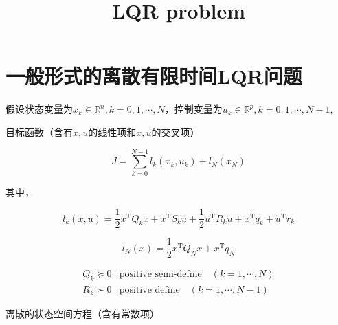 \documentclass[withoutpreface,bwprint]{NoteBook}
\title{LQR problem}  %
\begin{document}
\maketitle






\tableofcontents  %
\newpage


\section{一般形式的离散有限时间LQR问题}

假设状态变量为$x_k \in \mathbb{R}^n,k=0,1,\cdots,N$，控制变量为$u_k \in \mathbb{R}^p,k=0,1,\cdots,N-1$,

目标函数（含有$x,u$的线性项和$x,u$的交叉项）

\begin{equation}
\label{eq:J}
J=\sum_{k=0}^{N-1}{l_k\left( x_k,u_k \right)}+l_N\left( x_N \right) 
\end{equation}

其中，

\begin{equation}
\label{eq:l_k}
l_k\left( x,u \right) =\frac{1}{2}x^\mathrm{T} Q_k x  + x^\mathrm{T} S_k u + \frac{1}{2}u^\mathrm{T} R_k u + x^\mathrm{T}q_k + u^\mathrm{T} r_k
\end{equation}


\begin{equation}
\label{eq:l_N}
l_N\left( x \right) =\frac{1}{2}x^\mathrm{T} Q_N x + x^\mathrm{T}q_N 
\end{equation}


\begin{align*}
Q_k \succeq 0 & \text{positive semi-define} \quad (k=1,\cdots,N) \\
R_k \succ 0   & \text{positive define} \quad  (k=1,\cdots,N-1)
\end{align*}

离散的状态空间方程（含有常数项）
\end{document}
